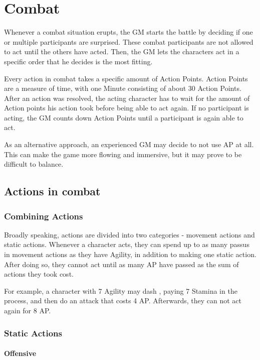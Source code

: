 
\chapter{Combat}
Whenever a combat situation erupts, the GM starts the battle by deciding if one or multiple participants are surprised.
These combat participants are not allowed to act until the others have acted.
Then, the GM lets the characters act in a specific order that he decides is the most fitting.

Every action in combat takes a specific amount of Action Points.
Action Points are a measure of time, with one Minute consisting of about 30 Action Points.
After an action was resolved, the acting character has to wait for the amount of Action points his action took before being able to act again.
If no participant is acting, the GM counts down Action Points until a participant is again able to act.

As an alternative approach, an experienced GM may decide to not use AP at all.
This can make the game more flowing and immersive, but it may prove to be difficult to balance.


\section{Actions in combat}

\subsection{Combining Actions}
Broadly speaking, actions are divided into two categories - movement actions and static actions.
Whenever a character acts, they can spend up to as many passus in movement actions as they have Agility, in addition to making one static action.
After doing so, they cannot act until as many AP have passed as the sum of actions they took cost.

For example, a character with 7 Agility may dash , paying 7 Stamina in the process, and then do an attack that costs 4 AP.
Afterwards, they can not act again for 8 AP.

\subsection{Static Actions}

\subsubsection{Offensive}

